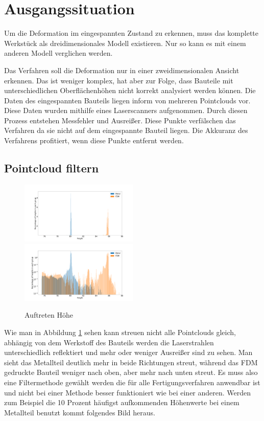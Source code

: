 \documentclass[../main.tex]{subfiles}
\begin{document}
\section{Ausgangssituation}

Um die Deformation im eingespannten Zustand zu erkennen, muss das komplette Werkstück
als dreidimensionales Modell existieren. Nur so kann es mit einem anderen Modell 
verglichen werden.

Das Verfahren soll die Deformation nur in einer zweidimensionalen Ansicht erkennen. 
Das ist weniger komplex, hat aber zur Folge, dass Bauteile mit unterschiedlichen 
Oberflächenhöhen nicht korrekt analysiert werden können. 
Die Daten des eingespannten Bauteils liegen inform von mehreren Pointclouds vor.
Diese Daten wurden mithilfe eines Laserscanners aufgenommen. Durch diesen Prozess 
entstehen Messfehler und Ausreißer. Diese Punkte verfälschen das Verfahren da sie 
nicht auf dem eingespannte Bauteil liegen. Die Akkuranz des Verfahrens profitiert, 
wenn diese Punkte entfernt werden.

\subsection{Pointcloud filtern}

\begin{figure}[h]
    \centering
    \includegraphics[width=0.5\textwidth]{images/height_occurange.png}
    \includegraphics[width=0.5\textwidth]{images/height_occurange_log.png}
    \caption{Auftreten Höhe}
    \label{fig:brightness}
\end{figure}

Wie man in Abbildung \ref{fig:brightness} sehen kann streuen nicht alle Pointclouds 
gleich, abhängig von dem Werkstoff des Bauteils werden die Laserstrahlen unterschiedlich
reflektiert und mehr oder weniger Ausreißer sind zu sehen. 
Man sieht das Metallteil deutlich mehr in beide Richtungen 
streut, während das FDM gedruckte Bauteil weniger nach oben, aber mehr nach unten 
streut. Es muss also eine Filtermethode gewählt werden die für alle Fertigungsverfahren
anwendbar ist und nicht bei einer Methode besser funktioniert wie bei einer 
anderen. Werden zum Beispiel die 10 Prozent häufigst aufkommenden Höhenwerte bei einem
Metallteil benutzt kommt folgendes Bild heraus.
\end{document}
